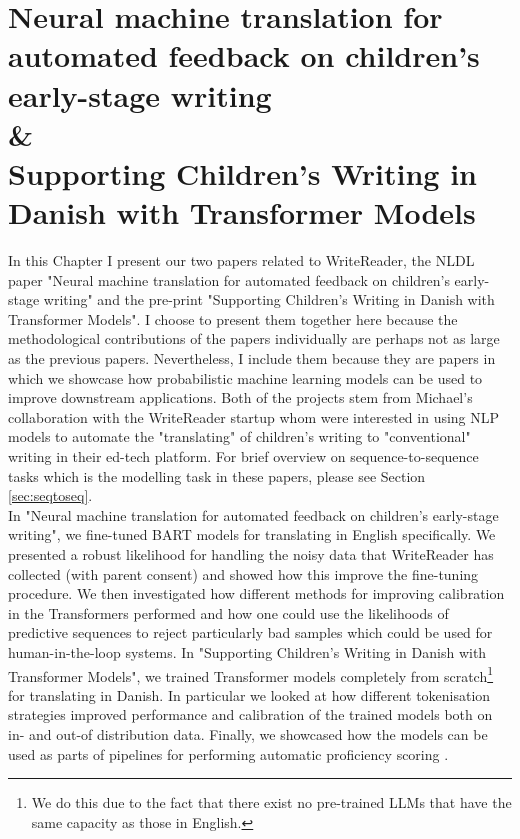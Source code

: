 \chapter{Neural machine translation for automated feedback on children’s early-stage writing \\
\& \\ Supporting Children's Writing in Danish with Transformer Models}
In this Chapter I present our two papers related to WriteReader, the NLDL paper "Neural machine translation for automated feedback on children’s early-stage writing" and the pre-print "Supporting Children's Writing in Danish with Transformer Models". I choose to present them together here because the methodological contributions of the papers individually are perhaps not as large as the previous papers. Nevertheless, I include them because they are papers in which we showcase how probabilistic machine learning models can be used to improve downstream applications. Both of the projects stem from Michael's collaboration with the WriteReader startup whom were interested in using NLP models to automate the "translating" of children's writing to "conventional" writing in their ed-tech platform. For brief overview on sequence-to-sequence tasks which is the modelling task in these papers, please see Section \ref{sec:seqtoseq}. \\

\noindent In "Neural machine translation for
automated feedback on children’s
early-stage writing", we fine-tuned BART models for translating in English specifically. We presented a robust likelihood for handling the noisy data that WriteReader has collected (with parent consent) and showed how this improve the fine-tuning procedure. We then investigated how different methods for improving calibration in the Transformers performed and how one could use the likelihoods of predictive sequences to reject particularly bad samples which could be used for human-in-the-loop systems. In "Supporting Children's Writing in Danish with Transformer Models", we trained Transformer models completely from scratch\footnote{We do this due to the fact that there exist no pre-trained LLMs that have the same capacity as those in English.} for translating in Danish. In particular we looked at how different tokenisation strategies improved performance and calibration of the trained models both on in- and out-of distribution data. Finally, we showcased how the models can be used as parts of pipelines for performing automatic proficiency scoring \citep{AutomaticProficiencyWriting}.


